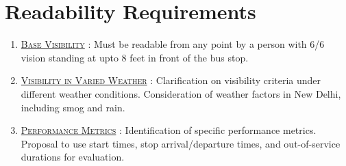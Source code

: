 \section{Readability Requirements}

\begin{enumerate}
    \item {}\underline{\textsc{Base Visibility}} : Must be readable from any point by a person with 6/6 vision standing at upto 8 feet in front of the bus stop.

    \item \underline{\textsc{Visibility in Varied Weather}} : Clarification on visibility criteria under different weather conditions. Consideration of weather factors in New Delhi, including smog and rain.

    \item \underline{\textsc{Performance Metrics}} : Identification of specific performance metrics. Proposal to use start times, stop arrival/departure times, and out-of-service durations for evaluation.

\end{enumerate}